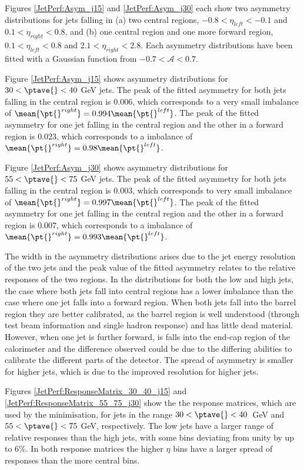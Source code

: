 Figures \ref{JetPerf:Asym_j15} and \ref{JetPerf:Asym_j30} each show two asymmetry distributions for jets falling in (a) two central regions, $-0.8<\eta_{left}<-0.1$ and $0.1<\eta_{right}<0.8$, and (b) one central region and one more forward region, $0.1<\eta_{left}<0.8$ and $2.1<\eta_{right}<2.8$. 
Each asymmetry distributions have been fitted with a Gaussian function from $-0.7<\mathcal{A}<0.7$.

Figure \ref{JetPerf:Asym_j15} shows asymmetry distributions for $30<\ptave{}<40$ GeV jets.
The peak of the fitted asymmetry for both jets falling in the central region is $0.006$, which corresponds to a very small \pt{} imbalance of $\mean{\pt{}^{right}}= 0.994 \mean{\pt{}^{left}}$.
The peak of the fitted asymmetry for one jet falling in the central region and the other in a forward region is $0.023$, which corresponds to a \pt{} imbalance of $\mean{\pt{}^{right}}= 0.98 \mean{\pt{}^{left}}$.

Figure \ref{JetPerf:Asym_j30} shows asymmetry distributions for $55<\ptave{}<75$ GeV jets.
The peak of the fitted asymmetry for both jets falling in the central region is $0.003$, which corresponds to very small \pt{} imbalance of $\mean{\pt{}^{right}}= 0.997 \mean{\pt{}^{left}}$. 
The peak of the fitted asymmetry for one jet falling in the central region and the other in a forward region is $0.007$, which corresponds to a \pt{} imbalance of $\mean{\pt{}^{right}}= 0.993 \mean{\pt{}^{left}}$.

The width in the asymmetry distributions arises due to the jet energy resolution of the two jets and the peak value of the fitted asymmetry relates to the relative responses of the two regions.
In the distributions for both the low and high \ptave{} jets, the case where both jets fall into central regions has a lower \pt{} imbalance than the case where one jet falls into a forward region.  
When both jets fall into the barrel region they are better calibrated, as the barrel region is well understood (through test beam information and single hadron response) and has little dead material.
However, when one jet is further forward, is falls into the end-cap region of the calorimeter and the difference observed could be due to the differing abilities to calibrate the different parts of the detector. 
The spread of asymmetry is smaller for higher \ptave{} jets, which is due to the improved resolution for higher \pt{} jets.


Figures \ref{JetPerf:ResponseMatrix_30_40_j15} and \ref{JetPerf:ResponseMatrix_55_75_j30} show the the response matrices, which are used by the minimisation, for jets in the range $30<\ptave{}<40$~GeV and $55<\ptave{}<75$ GeV, respectively.
The low \ptave{} jets have a larger range of relative responses than the high \ptave{} jets, with some bins deviating from unity by up to $6\%$.
In both response matrices the higher $\eta$ bins have a larger spread of responses than the more central bins.


